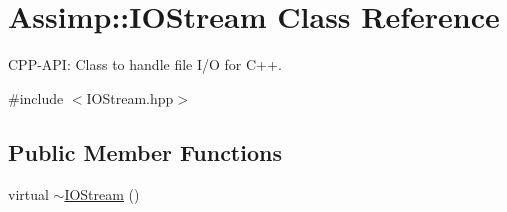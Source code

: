 \hypertarget{classAssimp_1_1IOStream}{\section{\-Assimp\-:\-:\-I\-O\-Stream \-Class \-Reference}
\label{classAssimp_1_1IOStream}
}


\-C\-P\-P-\/\-A\-P\-I\-: \-Class to handle file \-I/\-O for \-C++.  




{\ttfamily \#include $<$\-I\-O\-Stream.\-hpp$>$}

\subsection*{\-Public \-Member \-Functions}
\begin{DoxyCompactItemize}
\item 
\hypertarget{classAssimp_1_1IOStream_a6cedc5033bf531bf14b97d1c9b788de8}{virtual \hyperlink{classAssimp_1_1IOStream_a6cedc5033bf531bf14b97d1c9b788de8}{$\sim$\-I\-O\-Stream} ()}\label{classAssimp_1_1IOStream_a6cedc5033bf531bf14b97d1c9b788de8}


\end{DoxyCompactItemize}
